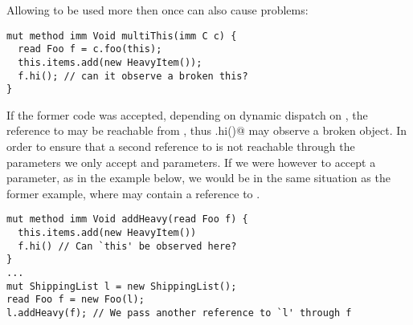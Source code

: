 \noindent Allowing \Q@this@ to be used more then once can also cause problems:
\saveSpace
\begin{lstlisting}
mut method imm Void multiThis(imm C c) {
  read Foo f = c.foo(this);
  this.items.add(new HeavyItem());
  f.hi(); // can it observe a broken this?
}
\end{lstlisting}
\saveSpace
\noindent If the former code was accepted, depending on dynamic dispatch on \Q@c@,
the reference to \Q@this@ may be reachable from \Q@f@, thus \Q@f.hi()@ may observe a broken object.
In order to ensure that a second reference to \Q@this@ is not reachable through the parameters we only accept \Q@imm@ and \Q@capsule@ parameters.
If we were however to accept a \Q@read@ parameter, as in the example below,
we would be in the same situation as the former example, where \Q@f@ may contain
a reference to \Q@this@.
\saveSpace
\begin{lstlisting}
mut method imm Void addHeavy(read Foo f) {
  this.items.add(new HeavyItem())
  f.hi() // Can `this' be observed here?
}
...
mut ShippingList l = new ShippingList();
read Foo f = new Foo(l);
l.addHeavy(f); // We pass another reference to `l' through f
\end{lstlisting}
\saveSpace



